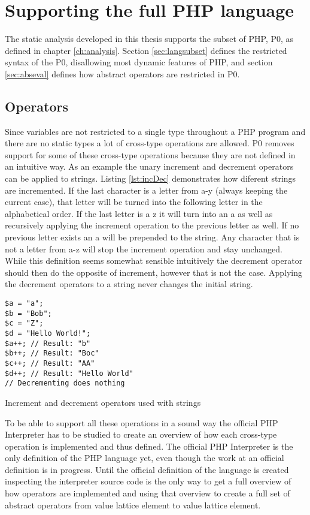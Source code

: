 \section{Supporting the full PHP language}
The static analysis developed in this thesis supports the subset of PHP, P0, as defined in chapter \ref{ch:analysis}.
Section \ref{sec:langsubset} defines the restricted syntax of the P0, disallowing most dynamic features of PHP, and section \ref{sec:abseval} defines how abstract operators are restricted in P0. 

\subsection{Operators}
Since variables are not restricted to a single type throughout a PHP program and there are no static types a lot of cross-type operations are allowed. P0 removes support for some of these cross-type operations because they are not defined in an intuitive way. As an example the unary increment and decrement operators can be applied to strings. Listing \ref{lst:incDec} demonstrates how diferent strings are incremented. If the last character is a letter from a-y (always keeping the current case), that letter will be turned into the following letter in the alphabetical order. If the last letter is a z it will turn into an a as well as recursively applying the increment operation to the previous letter as well. If no previous letter exists an a will be prepended to the string. Any character that is not a letter from a-z will stop the increment operation and stay unchanged. While this definition seems somewhat sensible intuitively the decrement operator should then do the opposite of increment, however that is not the case. Applying the decrement operators to a string never changes the initial string.

\begin{program}
\begin{lstlisting}
$a = "a";
$b = "Bob";
$c = "Z";
$d = "Hello World!";
$a++; // Result: "b"
$b++; // Result: "Boc"
$c++; // Result: "AA"
$d++; // Result: "Hello World"
// Decrementing does nothing
\end{lstlisting}
\caption{Increment and decrement operators used with strings}
\label{lst:incDec}
\end{program}

To be able to support all these operations in a sound way the official PHP Interpreter has to be studied to create an overview of how each cross-type operation is implemented and thus defined. The official PHP Interpreter is the only definition of the PHP language yet, even though the work at an official definition is in progress. Until the official definition of the language is created inspecting the interpreter source code is the only way to get a full overview of how operators are implemented and using that overview to create a full set of abstract operators from value lattice element to value lattice element.

